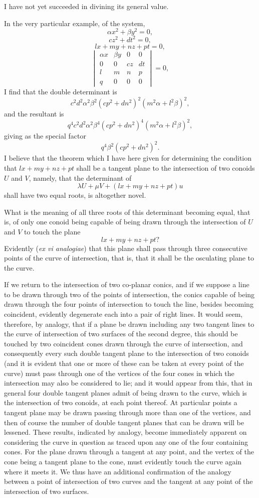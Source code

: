 \documentclass[11pt]{article}
\newcommand{\sourcepage}[1]{\marginpar{\scriptsize p.~#1}}
\begin{document}
I have not yet succeeded in divining its general value.

In the very particular example, of the system,
\[
\alpha x^2+\beta y^2=0,
\]
\[
cz^2+dt^2=0,
\]
\[
lx+my+nz+pt=0,
\]
\[
\begin{vmatrix}
\alpha x&\beta y&0&0\\
0&0&cz&dt\\
l&m&n&p\\
q&0&0&0
\end{vmatrix}=0,
\]
I find that the double determinant is
\[
c^2d^2\alpha^2\beta^2(cp^2+dn^2)^2(m^2\alpha+l^2\beta)^2,
\]
and the resultant is
\[
q^4c^2d^2\alpha^2\beta^4(cp^2+dn^2)^4(m^2\alpha+l^2\beta)^2,
\]
giving as the special factor
\[
q^4\beta^2(cp^2+dn^2)^2.
\]
I believe that the theorem which I have here given for determining the condition that $lx+my+nz+pt$ shall be a tangent plane to the intersection of two conoids $U$ and $V$, namely, that the determinant of
\[
\lambda U+\mu V+(lx+my+nz+pt)u
\]
shall have two equal roots, is altogether novel.

\sourcepage{144}
What is the meaning of all three roots of this determinant becoming equal, that is, of only one conoid being capable of being drawn through the intersection of $U$ and $V$ to touch the plane
\[
lx+my+nz+pt?
\]
Evidently (\emph{ex vi analogiae}) that this plane shall pass through three consecutive points of the curve of intersection, that is, that it shall be the osculating plane to the curve.

If we return to the intersection of two co-planar conics, and if we suppose a line to be drawn through two of the points of intersection, the conics capable of being drawn through the four points of intersection to touch the line, besides becoming coincident, evidently degenerate each into a pair of right lines. It would seem, therefore, by analogy, that if a plane be drawn including any two tangent lines to the curve of intersection of two surfaces of the second degree, this should be touched by two coincident cones drawn through the curve of intersection, and consequently every such double tangent plane to the intersection of two conoids (and it is evident that one or more of these can be taken at every point of the curve) must pass through one of the vertices of the four cones in which the intersection may also be considered to lie; and it would appear from this, that in general four double tangent planes admit of being drawn to the curve, which is the intersection of two conoids, at each point thereof. At particular points a tangent plane may be drawn passing through more than one of the vertices, and then of course the number of double tangent planes that can be drawn will be lessened. These results, indicated by analogy, become immediately apparent on considering the curve in question as traced upon any one of the four containing cones. For the plane drawn through a tangent at any point, and the vertex of the cone being a tangent plane to the cone, must evidently touch the curve again where it meets it. We thus have an additional confirmation of the analogy between a point of intersection of two curves and the tangent at any point of the intersection of two surfaces.
\end{document}
